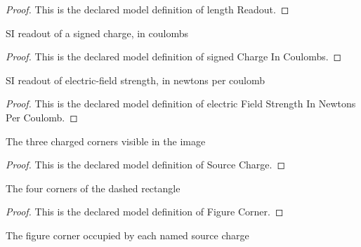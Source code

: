 \begin{proof}
  This is the declared model definition of length Readout.
\end{proof}
\begin{definition}
  \label{def:physics:phyx-mini-0832:phyxminiproblems-problemphyxmini0832-signedchargeincoulombs}
  SI readout of a signed charge, in coulombs
\end{definition}
\begin{proof}
  This is the declared model definition of signed Charge In Coulombs.
\end{proof}
\begin{definition}
  \label{def:physics:phyx-mini-0832:phyxminiproblems-problemphyxmini0832-electricfieldstrengthinnewtonspercoulomb}
  SI readout of electric-field strength, in newtons per coulomb
\end{definition}
\begin{proof}
  This is the declared model definition of electric Field Strength In Newtons Per Coulomb.
\end{proof}
\begin{definition}
  \label{def:physics:phyx-mini-0832:phyxminiproblems-problemphyxmini0832-sourcecharge}
  The three charged corners visible in the image
\end{definition}
\begin{proof}
  This is the declared model definition of Source Charge.
\end{proof}
\begin{definition}
  \label{def:physics:phyx-mini-0832:phyxminiproblems-problemphyxmini0832-figurecorner}
  The four corners of the dashed rectangle
\end{definition}
\begin{proof}
  This is the declared model definition of Figure Corner.
\end{proof}
\begin{definition}
  \label{def:physics:phyx-mini-0832:phyxminiproblems-problemphyxmini0832-sourcecorner}
  The figure corner occupied by each named source charge
\end{definition}
